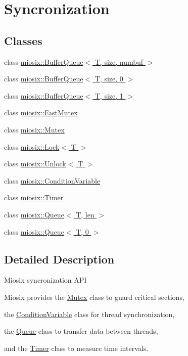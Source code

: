 \hypertarget{group___sync}{\section{Syncronization}
\label{group___sync}
}
\subsection*{Classes}
\begin{DoxyCompactItemize}
\item 
class \hyperlink{classmiosix_1_1_buffer_queue}{miosix\-::\-Buffer\-Queue$<$ T, size, numbuf $>$}
\item 
class \hyperlink{classmiosix_1_1_buffer_queue_3_01_t_00_01size_00_010_01_4}{miosix\-::\-Buffer\-Queue$<$ T, size, 0 $>$}
\item 
class \hyperlink{classmiosix_1_1_buffer_queue_3_01_t_00_01size_00_011_01_4}{miosix\-::\-Buffer\-Queue$<$ T, size, 1 $>$}
\item 
class \hyperlink{classmiosix_1_1_fast_mutex}{miosix\-::\-Fast\-Mutex}
\item 
class \hyperlink{classmiosix_1_1_mutex}{miosix\-::\-Mutex}
\item 
class \hyperlink{classmiosix_1_1_lock}{miosix\-::\-Lock$<$ T $>$}
\item 
class \hyperlink{classmiosix_1_1_unlock}{miosix\-::\-Unlock$<$ T $>$}
\item 
class \hyperlink{classmiosix_1_1_condition_variable}{miosix\-::\-Condition\-Variable}
\item 
class \hyperlink{classmiosix_1_1_timer}{miosix\-::\-Timer}
\item 
class \hyperlink{classmiosix_1_1_queue}{miosix\-::\-Queue$<$ T, len $>$}
\item 
class \hyperlink{classmiosix_1_1_queue_3_01_t_00_010_01_4}{miosix\-::\-Queue$<$ T, 0 $>$}
\end{DoxyCompactItemize}


\subsection{Detailed Description}
Miosix syncronization A\-P\-I

Miosix provides the \hyperlink{classmiosix_1_1_mutex}{Mutex} class to guard critical sections,\par
 the \hyperlink{classmiosix_1_1_condition_variable}{Condition\-Variable} class for thread synchronization,\par
 the \hyperlink{classmiosix_1_1_queue}{Queue} class to transfer data between threads,\par
 and the \hyperlink{classmiosix_1_1_timer}{Timer} class to measure time intervals. 